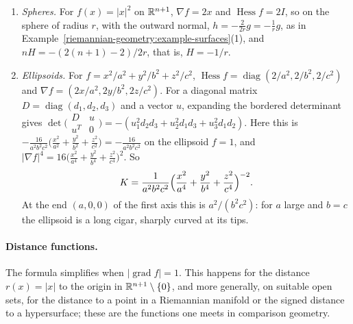 \begin{example}\label{riemannian-geometry:example-level-sets}
\begin{enumerate}
\item \emph{Spheres.} For $f(x) = |x|^2$ on $\mathbb{R}^{n+1}$, $\nabla f = 2x$ and $\operatorname{Hess}f = 2I$, so on the sphere of radius $r$, with the outward normal, $h = -\frac{2}{2r}g = -\frac1rg$, as in
Example~\ref{riemannian-geometry:example-surfaces}(1), and $nH = -(2(n+1) - 2)/2r$, that is, $H = -1/r$.
\item \emph{Ellipsoids.} For $f = x^2/a^2 + y^2/b^2 + z^2/c^2$, $\operatorname{Hess}f = \operatorname{diag}(2/a^2, 2/b^2, 2/c^2)$ and $\nabla f = (2x/a^2, 2y/b^2, 2z/c^2)$. For a diagonal matrix
$D = \operatorname{diag}(d_1, d_2, d_3)$ and a vector $u$, expanding the bordered determinant gives $\det\bigl(\begin{smallmatrix}D & u\\ u^T & 0\end{smallmatrix}\bigr) = -(u_1^2d_2d_3 + u_2^2d_1d_3 + u_3^2d_1d_2)$. Here this is
$-\frac{16}{a^2b^2c^2}\bigl(\frac{x^2}{a^2} + \frac{y^2}{b^2} + \frac{z^2}{c^2}\bigr) = -\frac{16}{a^2b^2c^2}$ on the ellipsoid $f = 1$, and $|\nabla f|^4 = 16\bigl(\frac{x^2}{a^4} + \frac{y^2}{b^4} + \frac{z^2}{c^4}\bigr)^2$. So
\[
K = \frac{1}{a^2b^2c^2}\Bigl(\frac{x^2}{a^4} + \frac{y^2}{b^4} + \frac{z^2}{c^4}\Bigr)^{-2} .
\]
At the end $(a, 0, 0)$ of the first axis this is $a^2/(b^2c^2)$: for $a$ large and $b = c$ the ellipsoid is a long cigar, sharply curved at its tips.
\end{enumerate}
\end{example}

\paragraph{Distance functions.} The formula simplifies when $|\operatorname{grad}f| = 1$. This happens for the distance $r(x) = |x|$ to the origin in $\mathbb{R}^{n+1} \setminus \{0\}$, and more generally, on suitable open
sets, for the distance to a point in a Riemannian manifold or the signed distance to a hypersurface; these are the functions one meets in comparison geometry.

